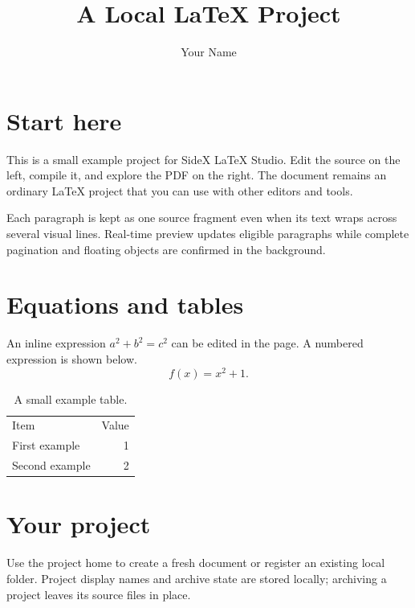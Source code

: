 \documentclass[11pt]{article}
\title{A Local LaTeX Project}
\author{Your Name}
\date{}
\begin{document}
\maketitle
\section{Start here}
This is a small example project for SideX LaTeX Studio. Edit the source on the left, compile it, and explore the PDF on the right. The document remains an ordinary LaTeX project that you can use with other editors and tools.

Each paragraph is kept as one source fragment even when its text wraps across several visual lines. Real-time preview updates eligible paragraphs while complete pagination and floating objects are confirmed in the background.
\section{Equations and tables}
An inline expression $a^2+b^2=c^2$ can be edited in the page. A numbered expression is shown below.
\begin{equation}\label{eq:sample}
f(x)=x^2+1.
\end{equation}
\begin{table}[ht]
\centering
\begin{tabular}{lr}
Item & Value \\
First example & 1 \\
Second example & 2
\end{tabular}
\caption{A small example table.}\label{tab:sample}
\end{table}
\section{Your project}
Use the project home to create a fresh document or register an existing local folder. Project display names and archive state are stored locally; archiving a project leaves its source files in place.
\end{document}
